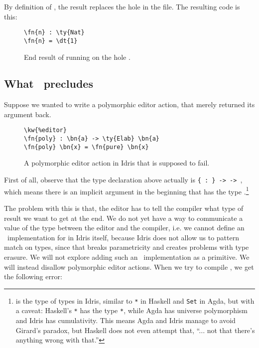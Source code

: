 By definition of , the result  replaces the hole
 in the file. The resulting code is this:

\begin{figure}[ht]
\caption{End result of running  on the hole .}
\begin{Verbatim}[framesep=2mm, label=\footnotesize{\normalfont{Idris}}, labelposition=topline]
\fn{n} : \ty{Nat}
\fn{n} = \dt{1}
\end{Verbatim}
\end{figure}

\subsection{What \Editorable\ precludes}\label{ssec:preclude}

Suppose we wanted to write a polymorphic editor action, that merely returned its argument back.

\begin{figure}[ht]
  \caption{A polymorphic editor action  in Idris that is supposed to fail.}
\begin{Verbatim}[framesep=2mm, label=\footnotesize{\normalfont{Idris}}, labelposition=topline]
\kw{%editor}
\fn{poly} : \bn{a} -> \ty{Elab} \bn{a}
\fn{poly} \bn{x} = \fn{pure} \bn{x}
\end{Verbatim}
\end{figure}

First of all, observe that the type declaration above actually is
\texttt{\{ : \} ->  ->  }, which means
there is an implicit argument in the beginning that has the type
.\footnote{ is the type of types in Idris, similar to
\texttt{*} in Haskell and \texttt{Set} in Agda, but with a caveat:
Haskell's \texttt{*} has the type \texttt{*}\cite{eisenberg}, while Agda has universe
polymorphism and Idris has cumulativity. This means Agda and Idris manage to
avoid Girard's paradox, but Haskell does not even attempt that, ``... not that
there's anything wrong with that.''\cite{outing}}

The problem with this is that, the editor has to tell the compiler what type of
result we want to get at the end. We do not yet have a way to communicate a
value of the type  between the editor and the compiler, i.e. we cannot
define an \Editorable\ implementation for  in Idris itself, because
Idris does not allow us to pattern match on types, since that breaks
parametricity and creates problems with type erasure.\cite{universePat}
We will not explore adding such an \Editorable\ implementation as a primitive.
We will instead disallow polymorphic editor actions.
When we try to compile , we get the following error:

